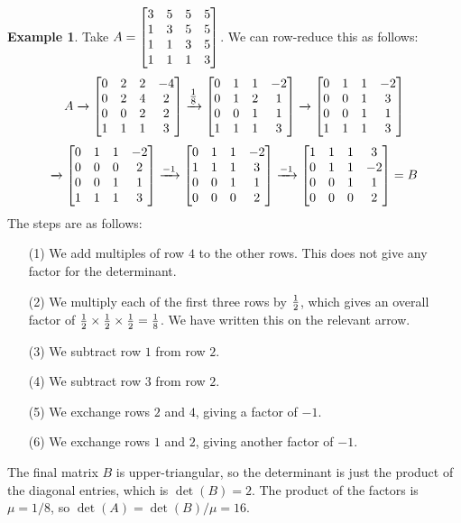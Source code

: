 \documentclass[reqno]{amsart}
\theoremstyle{definition}
\newtheorem{example}[theorem]{Example}
\begin{document}
\begin{example}\label{eg-det-ro-i}
 Take $A=\left[\begin{matrix} 3&5&5&5 \\ 1&3&5&5 \\ 1&1&3&5 \\ 1&1&1&3 \end{matrix}\right]$.  We can
 row-reduce this as follows:
 \[ A
  \xrightarrow{}
  \left[\begin{matrix} 0&2&2&-4 \\
       0&2&4&2 \\
       0&0&2&2 \\
       1&1&1&3 \end{matrix}\right]
  \xrightarrow{\tfrac{1}{8}}
  \left[\begin{matrix} 0&1&1&-2 \\
       0&1&2&1 \\
       0&0&1&1 \\
       1&1&1&3 \end{matrix}\right]
  \xrightarrow{}
  \left[\begin{matrix} 0&1&1&-2 \\
       0&0&1&3 \\
       0&0&1&1 \\
       1&1&1&3 \end{matrix}\right]
 \] \[
  \xrightarrow{}
  \left[\begin{matrix} 0&1&1&-2 \\
       0&0&0&2 \\
       0&0&1&1 \\
       1&1&1&3 \end{matrix}\right]
  \xrightarrow{-1}
  \left[\begin{matrix} 0&1&1&-2 \\
       1&1&1&3 \\
       0&0&1&1 \\
       0&0&0&2 \end{matrix}\right]
  \xrightarrow{-1}
  \left[\begin{matrix} 1&1&1&3 \\
       0&1&1&-2 \\
       0&0&1&1 \\
       0&0&0&2 \end{matrix}\right]
   = B
 \]
 The steps are as follows:
 \begin{itemize}
  \item[(1)] We add multiples of row $4$ to the other rows.  This does
   not give any factor for the determinant.
  \item[(2)] We multiply each of the first three rows by $\tfrac{1}{2}$, which
   gives an overall factor of $\tfrac{1}{2}\times\tfrac{1}{2}\times\tfrac{1}{2}=\frac{1}{8}$.  We
   have written this on the relevant arrow.
  \item[(3)] We subtract row $1$ from row $2$.
  \item[(4)] We subtract row $3$ from row $2$.
  \item[(5)] We exchange rows $2$ and $4$, giving a factor of $-1$.
  \item[(6)] We exchange rows $1$ and $2$, giving another factor of $-1$.
 \end{itemize}
 The final matrix $B$ is upper-triangular, so the determinant is just
 the product of the diagonal entries, which is $\det(B)=2$.  The
 product of the factors is $\mu=1/8$, so $\det(A)=\det(B)/\mu=16$.
\end{example}
\end{document}
